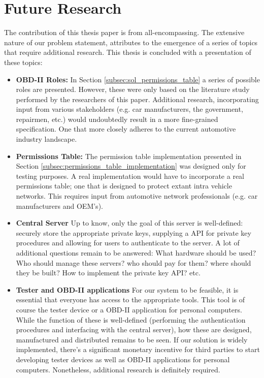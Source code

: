 \section{Future Research}
\label{sec:future_research}

The contribution of this thesis paper is from all-encompassing. The extensive nature of our problem statement, attributes to the emergence of a series of topics that require additional research. This thesis is concluded with a presentation of these topics:
\begin{itemize}
	\item \textbf{OBD-II Roles:} In Section \ref{subsec:sol_permissions_table} a series of possible roles are presented. However, these were only based on the literature study performed by the researchers of this paper. Additional research, incorporating input from various stakeholders (e.g. car manufacturers, the government, repairmen, etc.) would undoubtedly result in a more fine-grained specification. One that more closely adheres to the current automotive industry landscape.
	
	\item \textbf{Permissions Table:} The permission table implementation presented in Section \ref{subsec:permissions_table_implementation} was designed only for testing purposes. A real implementation would have to incorporate a real permissions table; one that is designed to protect extant intra vehicle networks. This requires input from automotive network professionals (e.g. car manufacturers and OEM's).
	
	\item \textbf{Central Server} Up to know, only the goal of this server is well-defined: securely store the appropriate private keys, supplying a API for private key procedures and allowing for users to authenticate to the server. A lot of additional questions remain to be answered: What hardware should be used? Who should manage these servers? who should pay for them? where should they be built? How to implement the private key API? etc.
	
	\item \textbf{Tester and OBD-II applications} For our system to be feasible, it is essential that everyone has access to the appropriate tools. This tool is of course the tester device or a OBD-II application for personal computers. While the function of these is well-defined (performing the authentication procedures and interfacing with the central server), how these are designed, manufactured and distributed remains to be seen. If our solution is widely implemented, there's a significant monetary incentive for third parties to start developing tester devices as well as OBD-II applications for personal computers. Nonetheless, additional research is definitely required.
\end{itemize}
